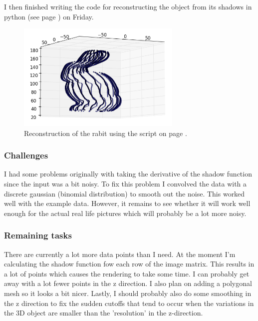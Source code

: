 \documentclass[a4paper]{article}
\begin{document}
I then finished writing the code for reconstructing the object from its shadows in python (see page \pageref{alg:shadow}) on Friday.

\begin{figure}[H]
  \centering
    \includegraphics[width=0.7\textwidth]{figures/rabit.png}
    \caption{Reconstruction of the rabit using the script on page \pageref{alg:shadow}.}
  \label{fig:f2}
\end{figure}

\subsubsection{Challenges}
I had some problems originally with taking the derivative of the shadow function since the input was a bit noisy.
To fix this problem I convolved the data with a discrete gaussian (binomial distribution) to smooth out the noise.
This worked well with the example data. 
However, it remains to see whether it will work well enough for the actual real life pictures which will probably be a lot more noisy.

\subsubsection{Remaining tasks}
There are currently a lot more data points than I need. At the moment I'm calculating the shadow function fow each row of the image matrix.
This results in a lot of points which causes the rendering to take some time.
I can probably get away with a lot fewer points in the z direction.
I also plan on adding a polygonal mesh so it looks a bit nicer.
Lastly, I should probably also do some smoothing in the z direction to fix the sudden cutoffs that tend to occur when the variations in the 3D object are smaller than the 'resolution' in the z-direction.
\end{document}
